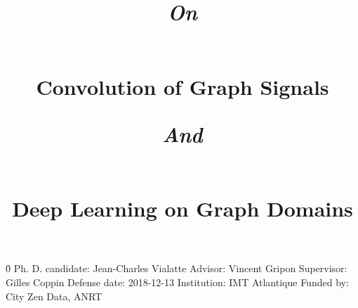 \documentclass[12pt]{book}
\begin{document}

%
%

\pagestyle{empty}
\newline
\newline \h{0}\newline
Ph. D. candidate: Jean-Charles Vialatte\newline
Advisor: Vincent Gripon\newline
Supervisor: Gilles Coppin\newline
Defense date: 2018-12-13\newline
Institution: IMT Atlantique\newline
Funded by: City Zen Data, ANRT


%
%

\title{\begin{large}\emph{On}\end{large}\\Convolution of Graph Signals\\\begin{large}\emph{And}\end{large}\\Deep Learning on Graph Domains}
\date{}
\maketitle

%
%

\frontmatter
\pagestyle{plain}


%
%

 \dominitoc
 \tableofcontents
 \adjustmtc




% 

%
%

\mainmatter
\pagestyle{headings}

\end{document}
